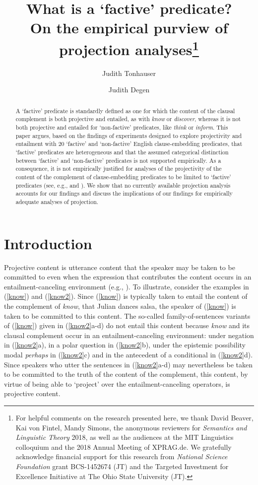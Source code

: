 \documentclass[11pt,fleqn]{article}
\title{What is a `factive' predicate? \\ On the empirical purview of projection analyses\thanks{For helpful comments on the research presented here, we thank David Beaver, Kai von Fintel, Mandy Simons, the anonymous reviewers for {\em Semantics and Linguistic Theory} 2018, as well as the audiences at the MIT Linguistics colloquium and the 2018 Annual Meeting of XPRAG.de. We gratefully acknowledge financial support for this research from {\em National Science Foundation} grant BCS-1452674 (JT) and the Targeted Investment for Excellence Initiative at The Ohio State University (JT).}}
\author[$\circ$]{Judith Tonhauser}
\author[$\bullet$]{Judith Degen}
\affil[$\circ$]{The Ohio State University / University of Stuttgart}
\affil[$\bullet$]{Stanford University}
\newcommand{\6}{\mbox{$[\hspace*{-.6mm}[$}}
\newcommand{\9}{\mbox{$]\hspace*{-.6mm}]$}}
\begin{document}

\maketitle


\begin{abstract}

A `factive' predicate is standardly defined as one for which the content of the clausal complement is both projective and entailed, as with {\em know} or {\em discover}, whereas it is not both projective and entailed for `non-factive' predicates, like {\em think} or {\em inform}. This paper argues, based on the findings of experiments designed to explore projectivity and entailment with 20 `factive' and `non-factive' English clause-embedding predicates, that `factive' predicates are heterogeneous and that the assumed categorical distinction between `factive' and `non-factive' predicates is not supported empirically. As a consequence, it is not empirically justified for analyses of the projectivity of the content of the complement of clause-embedding predicates to be limited to `factive' predicates (see, e.g., \citealt{heim83,vds92,abrusan2011,abrusan2016,romoli2015} and \citealt{best-question}). We show that no currently available projection analysis accounts for our findings and discuss the implications of our findings for empirically adequate analyses of projection.

\end{abstract}
			
\section{Introduction}\label{s1}

Projective content is utterance content that the speaker may be taken to be committed to even when the expression that contributes the content occurs in an entailment-canceling environment (e.g., \citealt{brst-salt10,brst-lang11,tbd-variability}). To illustrate, consider the examples in (\ref{know}) and (\ref{know2}). Since (\ref{know}) is typically taken to entail the content of the complement of {\em know}, that Julian dances salsa, the speaker of (\ref{know}) is taken to be committed to this content. The so-called family-of-sentences variants of (\ref{know}) given in (\ref{know2}a-d) do not entail this content because {\em know} and its clausal complement occur in an entailment-canceling environment: under negation in (\ref{know2}a), in a polar question in (\ref{know2}b), under the epistemic possibility modal {\em perhaps} in (\ref{know2}c) and in the antecedent of a conditional in (\ref{know2}d). Since speakers who utter the sentences in (\ref{know2}a-d) may nevertheless be taken to be committed to the truth of the content of the complement, this content, by virtue of being able to `project' over the entailment-canceling operators, is projective content. 
\end{document}
